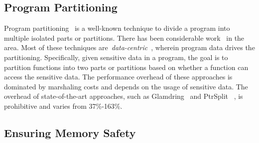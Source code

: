 \subsection{Program Partitioning}
\label{subsec:background:programpart}
Program partitioning~\cite{rul2009towards} is a well-known technique to divide a program into multiple isolated parts or partitions.
There has been considerable work~\cite{tan2017principles, brumley2004privtrans, bittau2008wedge, lind2017glamdring, liu2017ptrsplit} in the area.
Most of these techniques are~\emph{data-centric}~\cite{lind2017glamdring, liu2017ptrsplit}, wherein program data drives the partitioning.
Specifically, given sensitive data in a program, the goal is to partition functions into two parts or partitions based on whether a function can access the sensitive data.
The performance overhead of these approaches is dominated by marshaling costs and depends on the usage of sensitive data.
The overhead of state-of-the-art approaches, such as Glamdring~\cite{lind2017glamdring} and  PtrSplit~
\cite{liu2017ptrsplit}, is prohibitive and varies from 37\%-163\%.

\iffalse

\subsection{Ensuring Memory Safety}


